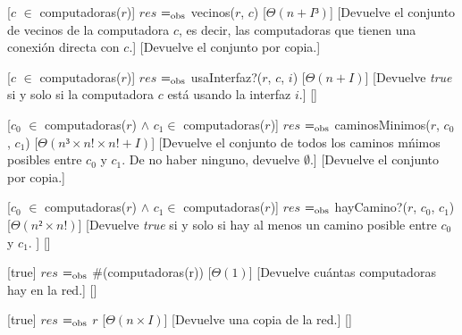 \begin{Interfaz}
  [$c$ $\in$ computadoras($r$)] %
  {$res$ $=_{\mathrm{obs}}$ vecinos($r$, $c$)} %
  [$\Theta(n+I³)$] %
  [Devuelve el conjunto de vecinos de la computadora $c$, es decir, las computadoras que tienen una conexi\'on directa con $c$.] %
  [Devuelve el conjunto por copia.] %
  
  [$c$ $\in$ computadoras($r$)] %
  {$res$ $=_{\mathrm{obs}}$ usaInterfaz?($r$, $c$, $i$)} %
  [$\Theta(n+I)$] %
  [Devuelve \emph{true} si y solo si la computadora $c$ est\'a usando la interfaz $i$.] %
  [] %
  
  [$c_{0}$ $\in$ computadoras($r$) $\land$ $c_{1} \in $ computadoras($r$)] %
  {$res$ $=_{\mathrm{obs}}$ caminosMinimos($r$, $c_{0}$, $c_{1}$)} %
  [$\Theta(n³ \times n! \times n! + I)$] %
  [Devuelve el conjunto de todos los caminos m\'nimos posibles entre $c_{0}$ y $c_{1}$. De no haber ninguno, devuelve $\emptyset$.] %
  [Devuelve el conjunto por copia.] %
  
  [$c_{0}$ $\in$ computadoras($r$) $\land$ $c_{1} \in $ computadoras($r$)] %
  {$res$ $=_{\mathrm{obs}}$ hayCamino?($r$, $c_{0}$, $c_{1}$)} %
  [$\Theta(n² \times n!)$] %
  [Devuelve \emph{true} si y solo si hay al menos un camino posible entre $c_{0}$ y $c_{1}$. ] %
  [] %
  
  [true] %
  {$res$ $=_{\mathrm{obs}}$ \#(computadoras(r))} %
  [$\Theta(1)$] %
  [Devuelve cu\'antas computadoras hay en la red.] %
  [] %

  [true] %
  {$res$ $=_{\mathrm{obs}}$ $r$} %
  [$\Theta(n \times I)$] %
  [Devuelve una copia de la red.] %
  [] %

\end{Interfaz}

